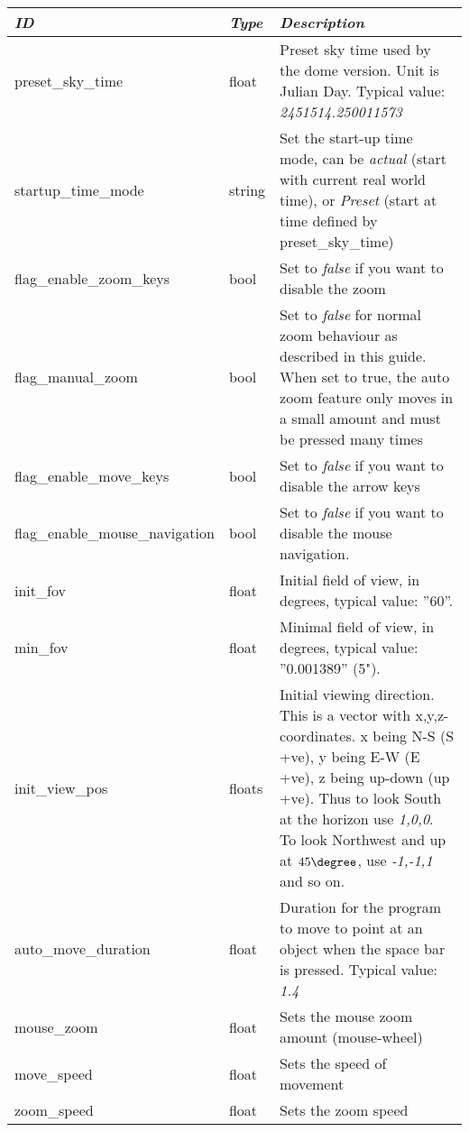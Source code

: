 \begin{longtabu} to \textwidth {l|l|X}\toprule
\emph{ID}              & \emph{Type} & \emph{Description}\\\midrule
preset\_sky\_time        & float & Preset sky time used by the dome version. Unit is Julian Day. Typical value: \emph{2451514.250011573}\\\midrule
startup\_time\_mode      & string & Set the start-up time mode, can be \emph{actual} (start with current real world time), 
                                    or \emph{Preset} (start at time defined by preset\_sky\_time)\\\midrule
flag\_enable\_zoom\_keys & bool & Set to \emph{false} if you want to disable the zoom\\\midrule
flag\_manual\_zoom       & bool & Set to \emph{false} for normal zoom behaviour as described in this guide. 
                                  When set to true, the auto zoom feature only moves in a small amount and must be pressed many times\\\midrule
flag\_enable\_move\_keys & bool & Set to \emph{false} if you want to disable the arrow keys\\\midrule
flag\_enable\_mouse\_navigation & bool & Set to \emph{false} if you want to disable the mouse navigation.\\\midrule
init\_fov                       & float & Initial field of view, in degrees, typical value: ''60''.\\\midrule
min\_fov                       & float & Minimal field of view, in degrees, typical value: ''0.001389'' (5").\\\midrule
init\_view\_pos                 & floats & Initial viewing direction. This is a vector with x,y,z-coordinates. x being N-S (S +ve), 
                                  y being E-W (E +ve), z being up-down (up +ve). Thus to look South at the horizon use \emph{1,0,0}. 
                                  To look Northwest and up at $45\degree$, use \emph{-1,-1,1} and so on.\\\midrule
auto\_move\_duration            & float & Duration for the program to move to point at an object when the space bar is pressed. Typical value: \emph{1.4}\\\midrule
mouse\_zoom                     & float & Sets the mouse zoom amount (mouse-wheel)\\\midrule
move\_speed                     & float & Sets the speed of movement\\\midrule
zoom\_speed                     & float & Sets the zoom speed\\\midrule

\end{longtabu}
